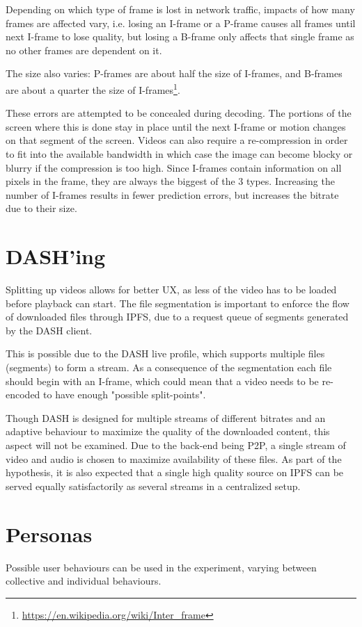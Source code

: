 Depending on which type of frame is lost in network traffic, impacts of how many frames are affected vary, i.e. losing an \ac{I-frame} or a \ac{P-frame} causes all frames until next \ac{I-frame} to lose quality, but losing a \ac{B-frame} only affects that single frame as no other frames are dependent on it.

The size also varies: \acp{P-frame} are about half the size of \acp{I-frame}, and \acp{B-frame} are about a quarter the size of \acp{I-frame}\footnote{\url{https://en.wikipedia.org/wiki/Inter_frame}}.

These errors are attempted to be concealed during decoding. The portions of the screen where this is done stay in place until the next \ac{I-frame} or motion changes on that segment of the screen. Videos can also require a re-compression in order to fit into the available bandwidth in which case the image can become blocky or blurry if the compression is too high.
Since \acp{I-frame} contain information on all pixels in the frame, they are always the biggest of the 3 types. Increasing the number of \acp{I-frame} results in fewer prediction errors, but increases the bitrate due to their size.

\section{DASH'ing}
\label{sec:des-dash}
Splitting up videos allows for better \ac{UX}, as less of the video has to be loaded before playback can start. The file segmentation is important to enforce the flow of downloaded files through IPFS, due to a request queue of segments generated by the \ac{DASH} client.

This is possible due to the \ac{DASH} live profile, which supports multiple files (segments) to form a stream. As a consequence of the segmentation each file should begin with an \ac{I-frame}, which could mean that a video needs to be re-encoded to have enough "possible split-points".

Though \ac{DASH} is designed for multiple streams of different bitrates and an adaptive behaviour to maximize the quality of the downloaded content, this aspect will not be examined. Due to the back-end being \ac{P2P}, a single stream of video and audio is chosen to maximize availability of these files. As part of the hypothesis, it is also expected that a single high quality source on \ac{IPFS} can be served equally satisfactorily as several streams in a centralized setup.

\section{Personas}
\label{sec:des-persona}
Possible user behaviours can be used in the experiment, varying between collective and individual behaviours.

